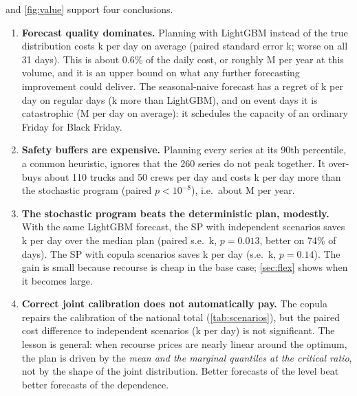  and \cref{fig:value} support four conclusions.
\begin{enumerate}
  \item \textbf{Forecast quality dominates.} Planning with LightGBM instead of the true distribution costs k per day on average (paired standard error k; worse on all 31 days). This is about 0.6\% of the daily cost, or roughly M per year at this volume, and it is an upper bound on what any further forecasting improvement could deliver. The seasonal-naive forecast has a regret of k per day on regular days (k more than LightGBM), and on event days it is catastrophic (M per day on average): it schedules the capacity of an ordinary Friday for Black Friday.
  \item \textbf{Safety buffers are expensive.} Planning every series at its 90th percentile, a common heuristic, ignores that the 260 series do not peak together. It over-buys about 110 trucks and 50 crews per day and costs k per day more than the stochastic program (paired $p<10^{-8}$), i.e.\ about M per year.
  \item \textbf{The stochastic program beats the deterministic plan, modestly.} With the same LightGBM forecast, the SP with independent scenarios saves k per day over the median plan (paired s.e.\ k, $p=0.013$, better on 74\% of days). The SP with copula scenarios saves k per day (s.e.\ k, $p=0.14$). The gain is small because recourse is cheap in the base case; \cref{sec:flex} shows when it becomes large.
  \item \textbf{Correct joint calibration does not automatically pay.} The copula repairs the calibration of the national total (\cref{tab:scenarios}), but the paired cost difference to independent scenarios (k per day) is not significant. The lesson is general: when recourse prices are nearly linear around the optimum, the plan is driven by the \emph{mean and the marginal quantiles at the critical ratio}, not by the shape of the joint distribution. Better forecasts of the level beat better forecasts of the dependence.
\end{enumerate}
